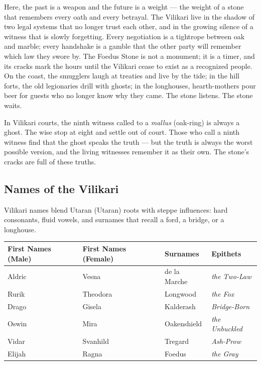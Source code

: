 Here, the past is a weapon and the future is a weight --- the weight of a stone that remembers every oath and every betrayal. The Vilikari live in the shadow of two legal systems that no longer trust each other, and in the growing silence of a witness that is slowly forgetting. Every negotiation is a tightrope between oak and marble; every handshake is a gamble that the other party will remember which law they swore by. The Foedus Stone is not a monument; it is a timer, and its cracks mark the hours until the Vilikari cease to exist as a recognized people. On the coast, the smugglers laugh at treaties and live by the tide; in the hill forts, the old legionaries drill with ghosts; in the longhouses, hearth-mothers pour beer for guests who no longer know why they came. The stone listens. The stone waits.

\begin{tcolorbox}[colback=black!3,colframe=red!60!black,title={The Ninth Taboo Manifestation},breakable]
In Vilikari courts, the ninth witness called to a \textit{mallus} (oak-ring) is always a ghost. The wise stop at eight and settle out of court. Those who call a ninth witness find that the ghost speaks the truth --- but the truth is always the worst possible version, and the living witnesses remember it as their own. The stone's cracks are full of these truths.
\end{tcolorbox}

\subsection*{Names of the Vilikari}
\label{sec:vilikari-names}

Vilikari names blend Utaran (Utaran) roots with steppe influences: hard consonants, fluid vowels, and surnames that recall a ford, a bridge, or a longhouse.

\begin{longtable}{|p{}|p{}|p{}|p{}|}
\hline
\textbf{First Names (Male)} & \textbf{First Names (Female)} & \textbf{Surnames} & \textbf{Epithets} \\
\hline
Aldric & Vesna & de la Marche & \textit{the Two-Law} \\
\hline
Rurik & Theodora & Longwood & \textit{the Fox} \\
\hline
Drago & Gisela & Kalderash & \textit{Bridge-Born} \\
\hline
Oswin & Mira & Oakenshield & \textit{the Unbuckled} \\
\hline
Vidar & Svanhild & Tregard & \textit{Ash-Prow} \\
\hline
Elijah & Ragna & Foedus & \textit{the Gray} \\
\hline
\end{longtable}

